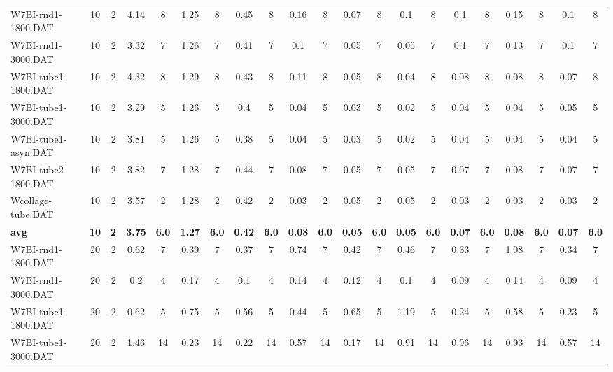 \begin{sidewaystable}[!ht]
{\begin{tabular}{lcccccccccccccccccccc}
W7BI-rnd1-1800.DAT & 10 & 2 & 4.14 & 8 & 1.25 & 8 & 0.45 & 8 & 0.16 & 8 &  \textcolor{blue2}{0.07} & 8 & 0.1 & 8 & 0.1 & 8 & 0.15 & 8 & 0.1 & 8 \\
W7BI-rnd1-3000.DAT & 10 & 2 & 3.32 & 7 & 1.26 & 7 & 0.41 & 7 & 0.1 & 7 &  \textcolor{blue2}{0.05} & 7 &  \textcolor{blue2}{0.05} & 7 & 0.1 & 7 & 0.13 & 7 & 0.1 & 7 \\
W7BI-tube1-1800.DAT & 10 & 2 & 4.32 & 8 & 1.29 & 8 & 0.43 & 8 & 0.11 & 8 & 0.05 & 8 &  \textcolor{blue2}{0.04} & 8 & 0.08 & 8 & 0.08 & 8 & 0.07 & 8 \\
W7BI-tube1-3000.DAT & 10 & 2 & 3.29 & 5 & 1.26 & 5 & 0.4 & 5 & 0.04 & 5 & 0.03 & 5 &  \textcolor{blue2}{0.02} & 5 & 0.04 & 5 & 0.04 & 5 & 0.05 & 5 \\
W7BI-tube1-asyn.DAT & 10 & 2 & 3.81 & 5 & 1.26 & 5 & 0.38 & 5 & 0.04 & 5 & 0.03 & 5 &  \textcolor{blue2}{0.02} & 5 & 0.04 & 5 & 0.04 & 5 & 0.04 & 5 \\
W7BI-tube2-1800.DAT & 10 & 2 & 3.82 & 7 & 1.28 & 7 & 0.44 & 7 & 0.08 & 7 &  \textcolor{blue2}{0.05} & 7 &  \textcolor{blue2}{0.05} & 7 & 0.07 & 7 & 0.08 & 7 & 0.07 & 7 \\
Wcollage-tube.DAT & 10 & 2 & 3.57 & 2 & 1.28 & 2 & 0.42 & 2 &  \textcolor{blue2}{0.03} & 2 & 0.05 & 2 & 0.05 & 2 &  \textcolor{blue2}{0.03} & 2 &  \textcolor{blue2}{0.03} & 2 &  \textcolor{blue2}{0.03} & 2 \\
\cline{1-21} \textbf{avg} & \textbf{10} & \textbf{2} & \textbf{3.75} & \textbf{6.0} & \textbf{1.27} & \textbf{6.0} & \textbf{0.42} & \textbf{6.0} & \textbf{0.08} & \textbf{6.0} & \textbf{0.05} & \textbf{6.0} & \textbf{0.05} & \textbf{6.0} & \textbf{0.07} & \textbf{6.0} & \textbf{0.08} & \textbf{6.0} & \textbf{0.07} & \textbf{6.0} \\ \cline{1-21}
W7BI-rnd1-1800.DAT & 20 & 2 & 0.62 & 7 & 0.39 & 7 & 0.37 & 7 & 0.74 & 7 & 0.42 & 7 & 0.46 & 7 &  \textcolor{blue2}{0.33} & 7 & 1.08 & 7 & 0.34 & 7 \\
W7BI-rnd1-3000.DAT & 20 & 2 & 0.2 & 4 & 0.17 & 4 & 0.1 & 4 & 0.14 & 4 & 0.12 & 4 & 0.1 & 4 &  \textcolor{blue2}{0.09} & 4 & 0.14 & 4 &  \textcolor{blue2}{0.09} & 4 \\
W7BI-tube1-1800.DAT & 20 & 2 & 0.62 & 5 & 0.75 & 5 & 0.56 & 5 & 0.44 & 5 & 0.65 & 5 & 1.19 & 5 & 0.24 & 5 & 0.58 & 5 &  \textcolor{blue2}{0.23} & 5 \\
W7BI-tube1-3000.DAT & 20 & 2 & 1.46 & 14 & 0.23 & 14 & 0.22 & 14 & 0.57 & 14 &  \textcolor{blue2}{0.17} & 14 & 0.91 & 14 & 0.96 & 14 & 0.93 & 14 & 0.57 & 14 \\

\end{tabular}}
\end{sidewaystable}
